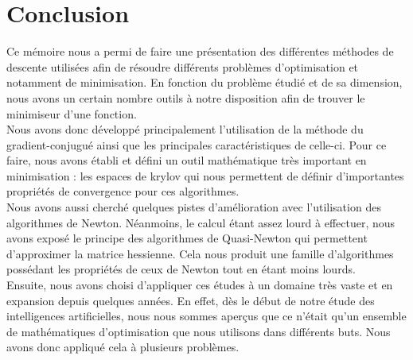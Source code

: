 \chapter{Conclusion}

Ce mémoire nous a permi de faire une présentation des différentes méthodes de descente utilisées afin de résoudre différents problèmes d'optimisation et notamment de minimisation. En fonction du problème étudié et de sa dimension, nous avons un certain nombre outils à notre disposition afin de trouver le minimiseur d'une fonction. \\

Nous avons donc développé principalement l'utilisation de la méthode du gradient-conjugué ainsi que les principales caractéristiques de celle-ci. Pour ce faire, nous avons établi et défini un outil mathématique très important en minimisation : les espaces de krylov qui nous permettent de définir d'importantes propriétés de convergence pour ces algorithmes.\\

 Nous avons aussi cherché quelques pistes d'amélioration avec l'utilisation des algorithmes de Newton. Néanmoins, le calcul étant assez lourd à effectuer, nous avons exposé le principe des algorithmes de Quasi-Newton qui permettent d'approximer la matrice hessienne. Cela nous produit une famille d'algorithmes possédant les propriétés de ceux de Newton tout en étant moins lourds.\\

Ensuite, nous avons choisi d'appliquer ces études à un domaine très vaste et en expansion depuis quelques années. En effet, dès le début de notre étude des intelligences artificielles, nous nous sommes aperçus que ce n'était qu'un ensemble de mathématiques d'optimisation que nous utilisons dans différents buts. Nous avons donc appliqué cela à plusieurs problèmes. 